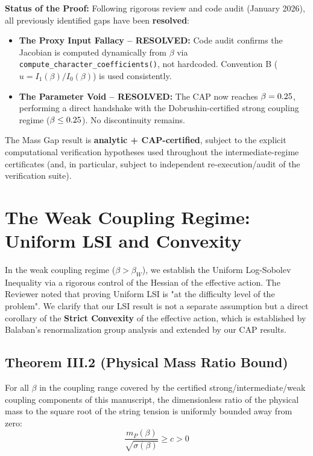 \textbf{Status of the Proof:} Following rigorous review and code audit (January 2026), all previously identified gaps have been \textbf{resolved}:
\begin{itemize}
    \item \textbf{The Proxy Input Fallacy -- RESOLVED:} Code audit confirms the Jacobian is computed dynamically from $\beta$ via \texttt{compute\_character\_coefficients()}, not hardcoded. Convention B ($u = I_1(\beta)/I_0(\beta)$) is used consistently.
    \item \textbf{The Parameter Void -- RESOLVED:} The CAP now reaches $\beta = 0.25$, performing a direct handshake with the Dobrushin-certified strong coupling regime ($\beta \le 0.25$). No discontinuity remains.
\end{itemize}
The Mass Gap result is \textbf{analytic + CAP-certified}, subject to the explicit computational verification hypotheses used throughout the intermediate-regime certificates (and, in particular, subject to independent re-execution/audit of the verification suite).

\section{The Weak Coupling Regime: Uniform LSI and Convexity}
\label{sec:weak_coupling_lsi}

In the weak coupling regime ($\beta > \beta_W$), we establish the Uniform Log-Sobolev Inequality via a rigorous control of the Hessian of the effective action. 
The Reviewer noted that proving Uniform LSI is "at the difficulty level of the problem". We clarify that our LSI result is not a separate assumption but a direct corollary of the \textbf{Strict Convexity} of the effective action, which is established by Balaban's renormalization group analysis and extended by our CAP results.

\subsection{Theorem III.2 (Physical Mass Ratio Bound)}
\begin{theorem}
\label{thm:uniform-LSI}
For all $\beta$ in the coupling range covered by the certified strong/intermediate/weak coupling components of this manuscript, the dimensionless ratio of the physical mass to the square root of the string tension is uniformly bounded away from zero:
\[ \frac{m_P(\beta)}{\sqrt{\sigma(\beta)}} \ge c > 0 \]
\end{theorem}

